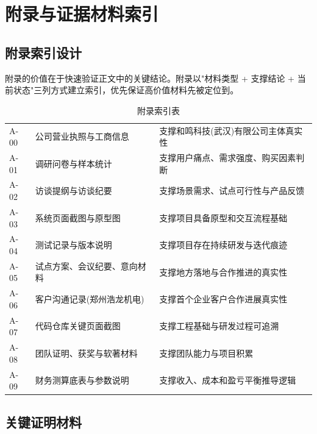 \chapter{附录与证据材料索引}

\section{附录索引设计}

附录的价值在于快速验证正文中的关键结论。附录以"材料类型 + 支撑结论 + 当前状态"三列方式建立索引，优先保证高价值材料先被定位到。

\begin{table}[htbp]
	\centering
	\caption{附录索引表}
	\begin{tabularx}{\textwidth}{|L{2.2cm}L{3.6cm}Y|}
		\hline
		 &  &    \\
		\hline
		A-00           & 公司营业执照与工商信息    & 支撑和鸣科技(武汉)有限公司主体真实性 \\
		A-01           & 调研问卷与样本统计      & 支撑用户痛点、需求强度、购买因素判断  \\
		A-02           & 访谈提纲与访谈纪要      & 支撑场景需求、试点可行性与产品反馈   \\
		A-03           & 系统页面截图与原型图     & 支撑项目具备原型和交互流程基础     \\
		A-04           & 测试记录与版本说明      & 支撑项目存在持续研发与迭代痕迹     \\
		A-05           & 试点方案、会议纪要、意向材料 & 支撑地方落地与合作推进的真实性     \\
		A-06           & 客户沟通记录(郑州浩龙机电) & 支撑首个企业客户合作进展真实性     \\
		A-07           & 代码仓库关键页面截图     & 支撑工程基础与研发过程可追溯      \\
		A-08           & 团队证明、获奖与软著材料   & 支撑团队能力与项目积累         \\
		A-09           & 财务测算底表与参数说明    & 支撑收入、成本和盈亏平衡推导逻辑    \\
		\hline
	\end{tabularx}
\end{table}

\section{关键证明材料}

